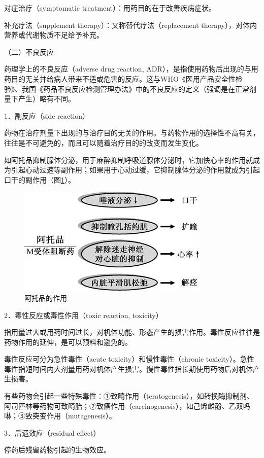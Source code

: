 对症治疗（symptomatic treatment）：用药目的在于改善疾病症状。

补充疗法（supplement therapy）：又称替代疗法（replacement
therapy），对体内营养或代谢物质不足给予补充。

（二）不良反应

药理学上的不良反应（adverse drug reaction,
ADR），是指使用药物后出现的与用药目的无关并给病人带来不适或危害的反应。这与WHO《医用产品安全性检验》、我国《药品不良反应检测管理办法》中的不良反应的定义（强调是在正常剂量下产生）略有不同。

1．副反应（side reaction）

药物在治疗剂量下出现的与治疗目的无关的作用。与药物作用的选择性不高有关，往往是不可避免的，而且可以随着治疗目的的改变而发生变化。

如阿托品抑制腺体分泌，用于麻醉抑制呼吸道腺体分泌时，它加快心率的作用就成为引起心动过速等副作用；如果用于心动过缓，它抑制腺体分泌的作用就成为引起口干的副作用（图\ref{fig2-1}）。

\begin{figure}[!htbp]
 \centering
 \includegraphics{./images/Image00004.jpg}
 \captionsetup{justification=centering}
 \caption{阿托品的作用}
 \label{fig2-1}
  \end{figure} 

2．毒性反应或毒性作用（toxic reaction, toxicity）

指用量过大或用药时间过长，对机体功能、形态产生的损害作用。毒性反应往往是药物作用的延伸，是可以预料和避免的。

毒性反应可分为急性毒性（acute toxicity）和慢性毒性（chronic
toxicity）。急性毒性指短时间内大剂量用药对机体产生损害。慢性毒性指长期使用药物后对机体产生损害。

有些药物会引起一些特殊毒性：①致畸作用（teratogenesis），如转换酶抑制剂、阿司匹林等药物可致畸胎；②致癌作用（carcinogenesis），如己烯雌酚、乙双吗啉；③致突变作用（mutagenesis）。

3．后遗效应（residual effect）

停药后残留药物引起的生物效应。

